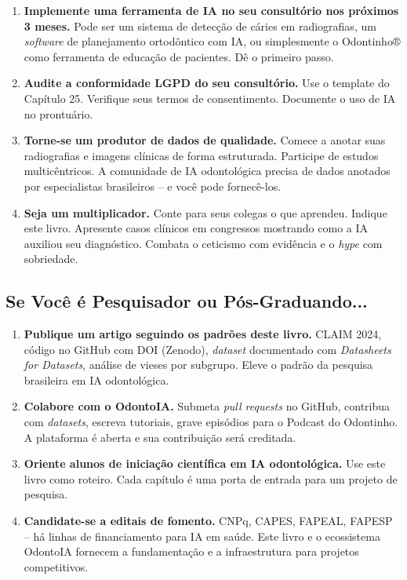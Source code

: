 \begin{enumerate}
  \item \textbf{Implemente uma ferramenta de IA no seu consultório nos próximos
    3 meses.} Pode ser um sistema de detecção de cáries em radiografias, um
    \textit{software} de planejamento ortodôntico com IA, ou simplesmente o
    Odontinho® como ferramenta de educação de pacientes. Dê o primeiro passo.

  \item \textbf{Audite a conformidade LGPD do seu consultório.} Use o template
    do Capítulo 25. Verifique seus termos de consentimento. Documente o uso de
    IA no prontuário.

  \item \textbf{Torne-se um produtor de dados de qualidade.} Comece a anotar
    suas radiografias e imagens clínicas de forma estruturada. Participe de
    estudos multicêntricos. A comunidade de IA odontológica precisa de dados
    anotados por especialistas brasileiros -- e você pode fornecê-los.

  \item \textbf{Seja um multiplicador.} Conte para seus colegas o que aprendeu.
    Indique este livro. Apresente casos clínicos em congressos mostrando como
    a IA auxiliou seu diagnóstico. Combata o ceticismo com evidência e o
    \textit{hype} com sobriedade.
\end{enumerate}

\subsection{Se Você é Pesquisador ou Pós-Graduando...}

\begin{enumerate}
  \item \textbf{Publique um artigo seguindo os padrões deste livro.} CLAIM 2024,
    código no GitHub com DOI (Zenodo), \textit{dataset} documentado com
    \textit{Datasheets for Datasets}, análise de vieses por subgrupo. Eleve o
    padrão da pesquisa brasileira em IA odontológica.

  \item \textbf{Colabore com o OdontoIA.} Submeta \textit{pull requests} no
    GitHub, contribua com \textit{datasets}, escreva tutoriais, grave episódios
    para o Podcast do Odontinho. A plataforma é aberta e sua contribuição será
    creditada.

  \item \textbf{Oriente alunos de iniciação científica em IA odontológica.}
    Use este livro como roteiro. Cada capítulo é uma porta de entrada para um
    projeto de pesquisa.

  \item \textbf{Candidate-se a editais de fomento.} CNPq, CAPES, FAPEAL,
    FAPESP -- há linhas de financiamento para IA em saúde. Este livro e o
    ecossistema OdontoIA fornecem a fundamentação e a infraestrutura para
    projetos competitivos.
\end{enumerate}

